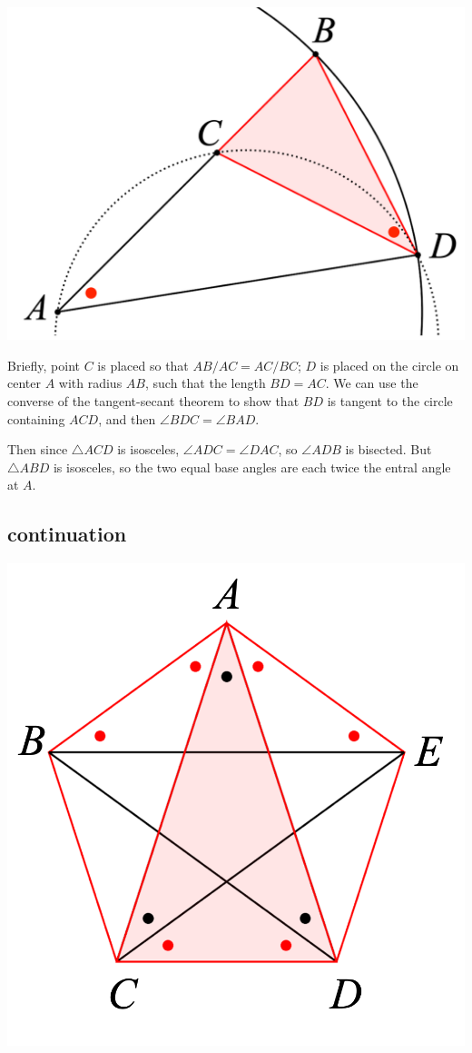 \documentclass[11pt, oneside]{article}
\begin{document}
\begin{center} \includegraphics [scale=0.3] {EIV_10_label.png} \end{center}

Briefly, point $C$ is placed so that $AB/AC = AC/BC$;  $D$ is placed on the circle on center $A$ with radius $AB$, such that the length $BD = AC$.  We can use the converse of the tangent-secant theorem to show that $BD$ is tangent to the circle containing $ACD$, and then $\angle BDC = \angle BAD$.  

Then since $\triangle ACD$ is isosceles, $\angle ADC = \angle DAC$, so $\angle ADB$ is bisected.  But $\triangle ABD$ is isosceles, so the two equal base angles are each twice the entral angle at $A$. 

\subsection*{continuation}

\begin{center} \includegraphics [scale=0.4] {pent2_label.png} \end{center}
\end{document}
